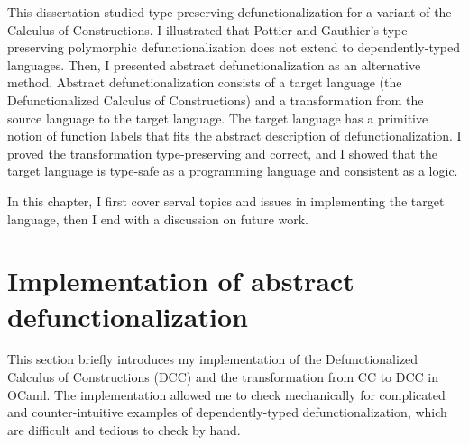 
This dissertation studied type-preserving defunctionalization for a variant of the Calculus of Constructions. I illustrated that Pottier and Gauthier's type-preserving polymorphic defunctionalization does not extend to dependently-typed languages. Then, I presented abstract defunctionalization as an alternative method. Abstract defunctionalization consists of a target language (the Defunctionalized Calculus of Constructions) and a transformation from the source language to the target language. The target language has a primitive notion of function labels that fits the abstract description of defunctionalization. I proved the transformation type-preserving and correct, and I showed that the target language is type-safe as a programming language and consistent as a logic.

In this chapter, I first cover serval topics and issues in implementing the target language, then I end with a discussion on future work.

\section{Implementation of abstract defunctionalization}

This section briefly introduces my implementation of the Defunctionalized Calculus of Constructions (DCC) and the transformation from CC to DCC in OCaml.
The implementation allowed me to check mechanically for complicated and counter-intuitive examples of dependently-typed defunctionalization, which are difficult and tedious to check by hand. 

